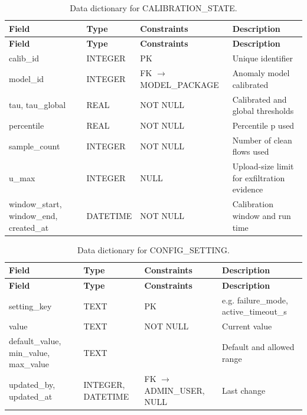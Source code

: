 {\small
\begin{longtable}{|>{\raggedright\arraybackslash}p{}|>{\raggedright\arraybackslash}p{}|>{\raggedright\arraybackslash}p{}|>{\raggedright\arraybackslash}p{}|}
\caption{Data dictionary for CALIBRATION\_STATE.}\label{tab:4.25}\\
\hline
\textbf{Field} & \textbf{Type} & \textbf{Constraints} & \textbf{Description} \\ \hline
\endfirsthead
\hline
\textbf{Field} & \textbf{Type} & \textbf{Constraints} & \textbf{Description} \\ \hline
\endhead
calib\_id & INTEGER & PK & Unique identifier \\ \hline
model\_id & INTEGER & FK $\rightarrow$ MODEL\_PACKAGE & Anomaly model calibrated \\ \hline
tau, tau\_global & REAL & NOT NULL & Calibrated and global thresholds \\ \hline
percentile & REAL & NOT NULL & Percentile p used \\ \hline
sample\_count & INTEGER & NOT NULL & Number of clean flows used \\ \hline
u\_max & INTEGER & NULL & Upload-size limit for exfiltration evidence \\ \hline
window\_start, window\_end, created\_at & DATETIME & NOT NULL & Calibration window and run time \\ \hline
\end{longtable}
}

{\small
\begin{longtable}{|>{\raggedright\arraybackslash}p{}|>{\raggedright\arraybackslash}p{}|>{\raggedright\arraybackslash}p{}|>{\raggedright\arraybackslash}p{}|}
\caption{Data dictionary for CONFIG\_SETTING.}\label{tab:4.26}\\
\hline
\textbf{Field} & \textbf{Type} & \textbf{Constraints} & \textbf{Description} \\ \hline
\endfirsthead
\hline
\textbf{Field} & \textbf{Type} & \textbf{Constraints} & \textbf{Description} \\ \hline
\endhead
setting\_key & TEXT & PK & e.g. failure\_mode, active\_timeout\_s \\ \hline
value & TEXT & NOT NULL & Current value \\ \hline
default\_value, min\_value, max\_value & TEXT &  & Default and allowed range \\ \hline
updated\_by, updated\_at & INTEGER, DATETIME & FK $\rightarrow$ ADMIN\_USER, NULL & Last change \\ \hline
\end{longtable}
}

